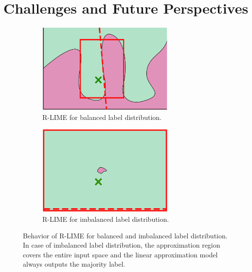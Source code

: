 \documentclass[11pt]{article}
\begin{document}
\section{Challenges and Future Perspectives}
 {%
  \def\imgwidth{0.47\textwidth}
  \begin{figure}[t]
    \centering
    \begin{subfigure}[t]{\imgwidth}
      \centering
      \includegraphics[width=0.75\textwidth]{visual-rlime3}
      \caption{R-LIME for balanced label distribution.}\label{fig:balanced}
    \end{subfigure}
    \begin{subfigure}[t]{\imgwidth}
      \centering
      \includegraphics[width=0.75\textwidth]{visual-rlime-imbalanced}
      \caption{R-LIME for imbalanced label distribution.
      }\label{fig:imbalanced}
    \end{subfigure}
    \caption[Behavior of R-LIME for balanced and imbalanced label distribution]{%
      Behavior of R-LIME for balanced and imbalanced label distribution.
      In case of imbalanced label distribution,
      the approximation region covers the entire input space and the
      linear approximation model always outputs the majority label.
    }
  \end{figure}
 }
\end{document}
